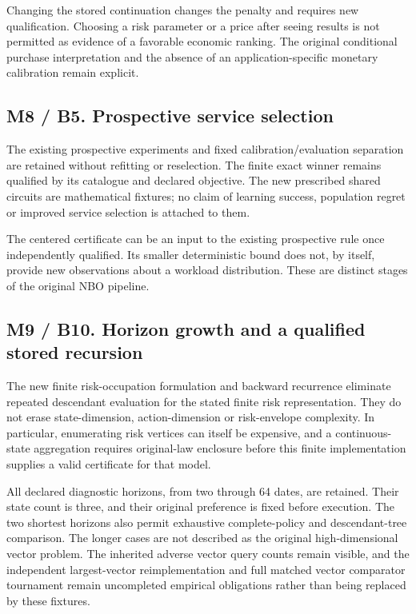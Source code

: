 Changing the stored continuation changes the penalty and requires new
qualification. Choosing a risk parameter or a price after seeing results
is not permitted as evidence of a favorable economic ranking. The
original conditional purchase interpretation and the absence of an
application-specific monetary calibration remain explicit.

\hypertarget{m8-b5.-prospective-service-selection}{%
\subsection{M8 / B5. Prospective service
selection}\label{m8-b5.-prospective-service-selection}}

The existing prospective experiments and fixed calibration/evaluation
separation are retained without refitting or reselection. The finite
exact winner remains qualified by its catalogue and declared objective.
The new prescribed shared circuits are mathematical fixtures; no claim
of learning success, population regret or improved service selection is
attached to them.

The centered certificate can be an input to the existing prospective
rule once independently qualified. Its smaller deterministic bound does
not, by itself, provide new observations about a workload distribution.
These are distinct stages of the original NBO pipeline.

\hypertarget{m9-b10.-horizon-growth-and-a-qualified-stored-recursion}{%
\subsection{M9 / B10. Horizon growth and a qualified stored
recursion}\label{m9-b10.-horizon-growth-and-a-qualified-stored-recursion}}

The new finite risk-occupation formulation and backward recurrence
eliminate repeated descendant evaluation for the stated finite risk
representation. They do not erase state-dimension, action-dimension or
risk-envelope complexity. In particular, enumerating risk vertices can
itself be expensive, and a continuous-state aggregation requires
original-law enclosure before this finite implementation supplies a
valid certificate for that model.

All declared diagnostic horizons, from two through 64 dates, are
retained. Their state count is three, and their original preference is
fixed before execution. The two shortest horizons also permit exhaustive
complete-policy and descendant-tree comparison. The longer cases are not
described as the original high-dimensional vector problem. The inherited
adverse vector query counts remain visible, and the independent
largest-vector reimplementation and full matched vector comparator
tournament remain uncompleted empirical obligations rather than being
replaced by these fixtures.


